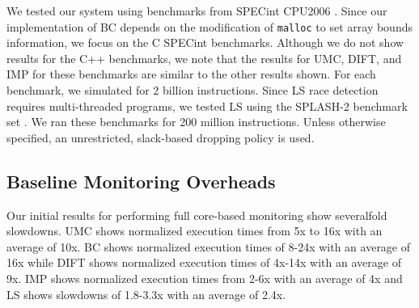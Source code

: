 We tested our system using benchmarks from SPECint
CPU2006 \cite{spec2006}. Since our implementation of BC depends on the
modification of {\tt malloc} to set array bounds information, we focus on the C
SPECint benchmarks. Although we do not
show results for the C++ benchmarks, we note that the results for UMC, DIFT, and IMP
for these benchmarks are similar to the other results shown. For each
benchmark, we simulated for 2 billion instructions. 
Since LS race detection requires multi-threaded programs, we tested LS using
the SPLASH-2 benchmark set \cite{splash-isca95}. We ran these benchmarks for
200 million instructions.
Unless otherwise specified, an unrestricted, slack-based dropping policy is
used.

\subsection{Baseline Monitoring Overheads}


Our initial results for performing full core-based monitoring show severalfold slowdowns.
UMC shows normalized execution times from 5x to 16x with an average
of 10x. BC shows normalized execution times of 8-24x with an average of
16x while DIFT shows normalized execution times of 4x-14x with an average of
9x. IMP shows normalized execution times from 2-6x with an average of 4x and LS
shows slowdowns of 1.8-3.3x with an average of 2.4x. 

